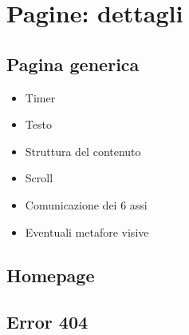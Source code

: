 		
	\section{Pagine: dettagli}
		\subsection*{Pagina generica}
				
				\begin{itemize}
					\item Timer
					\item Testo
					\item Struttura del contenuto
					\item Scroll
					\item Comunicazione dei 6 assi 
					\item Eventuali metafore visive
				\end{itemize}
				
			\subsection*{Homepage}
			\subsection*{Error 404}
	